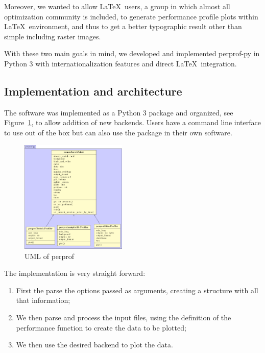     Moreover,  we wanted to allow \LaTeX\ users, a group in which almost all
    optimization community is included,  to   generate performance profile plots
    within \LaTeX\ environment, and thus to get a better typographic result other
    than simple including raster  images.

    With these two main goals in mind, we developed and implemented perprof-py
    in Python 3 with internationalization features and direct \LaTeX\ integration.

\subsection*{Implementation and architecture}

    The software was implemented as a Python 3 package
    and organized, see Figure~\ref{fig:uml},
    to allow addition of new backends.
    Users have a command line interface to use out of the box
    but can also use the package in their own software.

    \begin{figure}[!htb]
      \centering
      \includegraphics[width=0.45\textwidth]{uml/uml.pdf}
      \caption{UML of perprof}
      \label{fig:uml}
    \end{figure}

    The implementation is very straight forward:
    \begin{enumerate}
      \item First the parse the options passed as arguments, creating a
        structure with all that information;
      \item We then parse and process the input files, using the definition
        of the performance function to create the data to be plotted;
      \item We then use the desired backend to plot the data.
    \end{enumerate}

